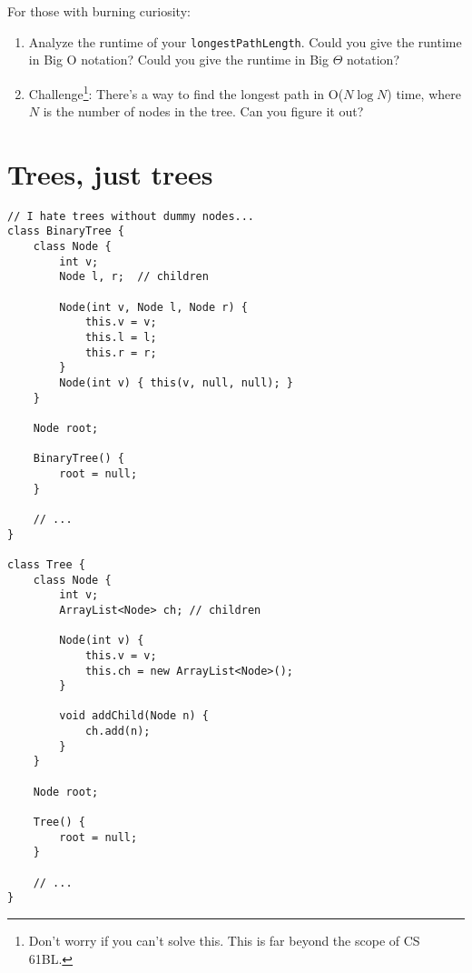 \documentclass{article}
\begin{document}
For those with burning curiosity:
\begin{enumerate}
    \item Analyze the runtime of your \verb|longestPathLength|.  Could you give the runtime in Big O notation?  Could you give the runtime in Big $\Theta$ notation?
    \item Challenge\footnote{Don't worry if you can't solve this.  This is far beyond the scope of CS 61BL.}: There's a way to find the longest path in O($N \log N$) time, where $N$ is the number of nodes in the tree.  Can you figure it out?
\end{enumerate}


\section{Trees, just trees}
\begin{verbatim}
// I hate trees without dummy nodes...
class BinaryTree {
    class Node {
        int v;
        Node l, r;  // children

        Node(int v, Node l, Node r) {
            this.v = v;
            this.l = l;
            this.r = r;
        }
        Node(int v) { this(v, null, null); }
    }

    Node root;

    BinaryTree() {
        root = null;
    }

    // ...
}

class Tree {
    class Node {
        int v;
        ArrayList<Node> ch; // children

        Node(int v) {
            this.v = v;
            this.ch = new ArrayList<Node>();
        }

        void addChild(Node n) {
            ch.add(n);
        }
    }

    Node root;

    Tree() {
        root = null;
    }

    // ...
}
\end{verbatim}
\end{document}

